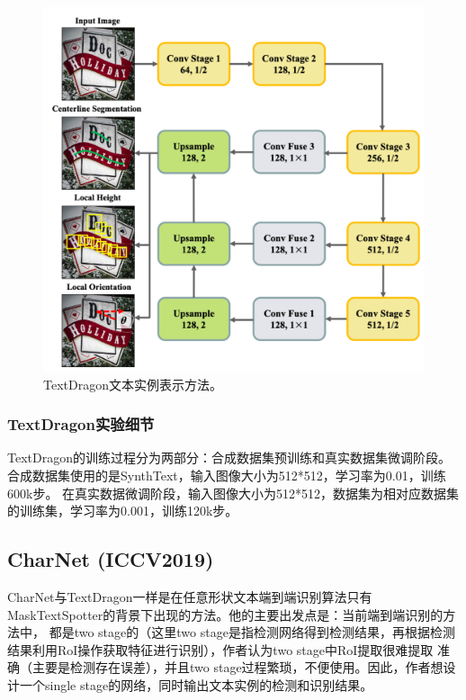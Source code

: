 \begin{figure}[htb]
    \centering
    \includegraphics[width=.7\textwidth]{figure/spotting/textdragon_representation.png} 
    \caption{TextDragon文本实例表示方法。} 
    \label{textdragon_representation} 
\end{figure}

\subsubsection{TextDragon实验细节}
TextDragon的训练过程分为两部分：合成数据集预训练和真实数据集微调阶段。
合成数据集使用的是SynthText，输入图像大小为512*512，学习率为0.01，训练600k步。
在真实数据微调阶段，输入图像大小为512*512，数据集为相对应数据集的训练集，学习率为0.001，训练120k步。

\subsection{CharNet (ICCV2019)}
CharNet与TextDragon一样是在任意形状文本端到端识别算法只有MaskTextSpotter的背景下出现的方法。他的主要出发点是：当前端到端识别的方法中，
都是two stage的（这里two stage是指检测网络得到检测结果，再根据检测结果利用RoI操作获取特征进行识别），作者认为two stage中RoI提取很难提取
准确（主要是检测存在误差），并且two stage过程繁琐，不便使用。因此，作者想设计一个single stage的网络，同时输出文本实例的检测和识别结果。
